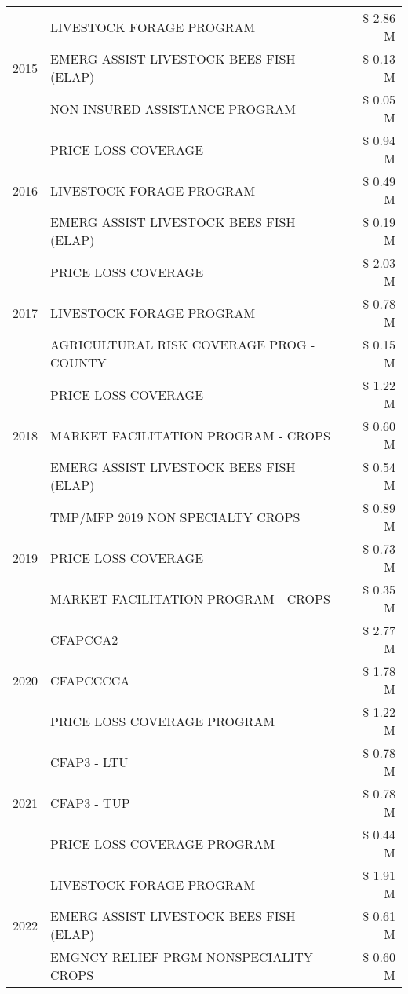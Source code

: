 \begin{tabular}{llr}
\cline{1-3}
\multirow[t]{3}{*}{2015} & LIVESTOCK FORAGE PROGRAM & \$ 2.86 M \\
 & EMERG ASSIST LIVESTOCK BEES FISH (ELAP) & \$ 0.13 M \\
 & NON-INSURED ASSISTANCE PROGRAM & \$ 0.05 M \\
\cline{1-3}
\multirow[t]{3}{*}{2016} & PRICE LOSS COVERAGE & \$ 0.94 M \\
 & LIVESTOCK FORAGE PROGRAM & \$ 0.49 M \\
 & EMERG ASSIST LIVESTOCK BEES FISH (ELAP) & \$ 0.19 M \\
\cline{1-3}
\multirow[t]{3}{*}{2017} & PRICE LOSS COVERAGE & \$ 2.03 M \\
 & LIVESTOCK FORAGE PROGRAM & \$ 0.78 M \\
 & AGRICULTURAL RISK COVERAGE PROG - COUNTY & \$ 0.15 M \\
\cline{1-3}
\multirow[t]{3}{*}{2018} & PRICE LOSS COVERAGE & \$ 1.22 M \\
 & MARKET FACILITATION PROGRAM - CROPS & \$ 0.60 M \\
 & EMERG ASSIST LIVESTOCK BEES FISH (ELAP) & \$ 0.54 M \\
\cline{1-3}
\multirow[t]{3}{*}{2019} & TMP/MFP 2019 NON SPECIALTY CROPS & \$ 0.89 M \\
 & PRICE LOSS COVERAGE & \$ 0.73 M \\
 & MARKET FACILITATION PROGRAM - CROPS & \$ 0.35 M \\
\cline{1-3}
\multirow[t]{3}{*}{2020} & CFAPCCA2 & \$ 2.77 M \\
 & CFAPCCCCA & \$ 1.78 M \\
 & PRICE LOSS COVERAGE PROGRAM & \$ 1.22 M \\
\cline{1-3}
\multirow[t]{3}{*}{2021} & CFAP3 - LTU & \$ 0.78 M \\
 & CFAP3 - TUP & \$ 0.78 M \\
 & PRICE LOSS COVERAGE PROGRAM & \$ 0.44 M \\
\cline{1-3}
\multirow[t]{3}{*}{2022} & LIVESTOCK FORAGE PROGRAM & \$ 1.91 M \\
 & EMERG ASSIST LIVESTOCK BEES FISH (ELAP) & \$ 0.61 M \\
 & EMGNCY RELIEF PRGM-NONSPECIALITY CROPS & \$ 0.60 M \\
\cline{1-3}
\bottomrule
\end{tabular}
